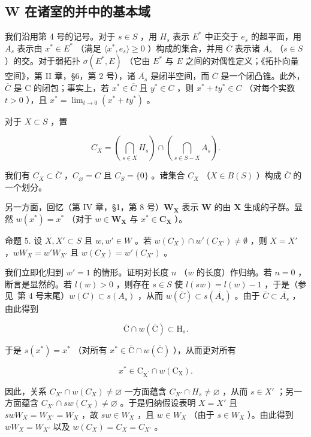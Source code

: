 \subsection{W 在诸室的并中的基本域}

我们沿用第 4 号的记号。对于 \(s \in S\) ，用 \(H_s\) 表示 \(E^*\) 中正交于 \(e_s\) 的超平面，用 \(\overline{A_s}\) 表示由 \(x^* \in E^*\) （满足 \(\langle x^*, e_s \rangle \geqslant 0\) ）构成的集合，并用 \(\overline{C}\) 表示诸 \(\overline{A_s}\) （\(s \in S\) ）的交。对于弱拓扑 \(\sigma(E^*, E)\) （它由 \(E^*\) 与 \(E\) 之间的对偶性定义；《拓扑向量空间》，第 II 章，§6，第 2 号），诸 \(\overline{A_s}\) 是闭半空间，而 \(\overline{C}\) 是一个闭凸锥。此外，\(\overline{C}\) 是 C 的闭包；事实上，若 \(x^* \in \overline{C}\) 且 \(y^* \in C\) ，则 \(x^* + ty^* \in C\) （对每个实数 \(t > 0\) ），且 \(x^* = \lim_{t \to 0} (x^* + ty^*)\) 。

对于 \(X\subset S\) ，置

\[
C _ {X} = \left(\bigcap_ {s \in X} H _ {s}\right) \cap \left(\bigcap_ {s \in S - X} A _ {s}\right).
\]

我们有 \(C_X \subset \overline{C}\) ，\(C_{\varnothing} = C\) 且 \(C_S = \{0\}\) 。诸集合 \(C_X\) （\(X \in B(S)\) ）构成 \(\overline{C}\) 的一个划分。

另一方面，回忆（第 IV 章，§1，第 8 号）\(\mathbf{W}_{\mathbf{X}}\) 表示 \(\mathbf{W}\) 的由 \(\mathbf{X}\) 生成的子群。显然 \(w(x^{*}) = x^{*}\) （对于 \(w \in \mathbf{W}_{\mathbf{X}}\) 与 \(x^{*} \in \mathbf{C}_{\mathbf{X}}\) ）。

命题 5. 设 \(X, X' \subset S\) 且 \(w, w' \in W\) 。若 \(w(C_X) \cap w'(C_{X'}) \neq \emptyset\) ，则 \(X = X'\) ，\(wW_X = w'W_{X'}\) 且 \(w(C_X) = w'(C_{X'})\) 。

我们立即化归到 \(w' = 1\) 的情形。证明对长度 \(n\) （\(w\) 的长度）作归纳。若 \(n = 0\) ，断言是显然的。若 \(l(w) > 0\) ，则存在 \(s \in S\) 使 \(l(sw) = l(w) - 1\) ，于是（参见~第 4 号末尾）\(w(C) \subset s(A_s)\) ，从而 \(w(\overline{C}) \subset s(\overline{A_s})\) 。由于 \(\overline{C} \subset \overline{A_s}\) ，由此得到

\[
\overline {{{\mathrm{C}}}} \cap w (\overline {{{\mathrm{C}}}}) \subset \mathrm{H} _ {s}.
\]

于是 \(s(x^{*}) = x^{*}\) （对所有 \(x^{*} \in \overline{\mathrm{C}} \cap w(\overline{\mathrm{C}})\) ），从而更对所有

\[
x ^ {*} \in \mathrm{C} _ {\mathrm{X} ^ {\prime}} \cap w (\mathrm{C} _ {\mathrm{X}}).
\]

因此，关系 \(C_{X'} \cap w(C_X) \neq \varnothing\) 一方面蕴含 \(C_{X'} \cap H_s \neq \varnothing\) ，从而 \(s \in X'\) ；另一方面蕴含 \(C_{X'} \cap sw(C_X) \neq \varnothing\) 。于是归纳假设表明 \(X = X'\) 且 \(swW_X = W_{X'} = W_X\) ，故 \(sw \in W_X\) ，且 \(w \in W_X\) （由于 \(s \in W_X\) ）。由此得到 \(wW_X = W_{X'}\) 以及 \(w(C_X) = C_X = C_{X'}\) 。

